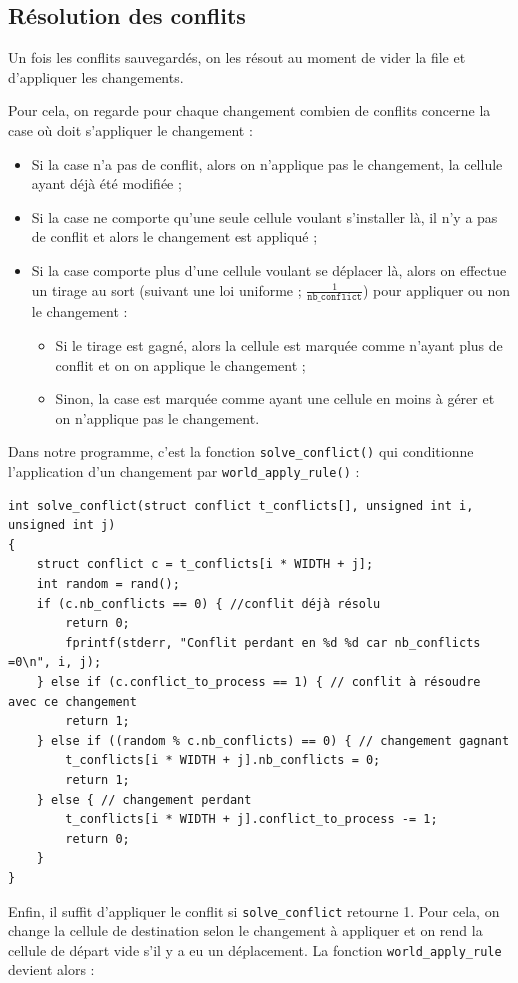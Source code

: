 \subsection{Résolution des conflits} \label{sec:Conflits}
Un fois les conflits sauvegardés, on les résout au moment de vider la file et d'appliquer les changements.

Pour cela, on regarde pour chaque changement combien de conflits concerne la case où doit s'appliquer le changement :
\begin{itemize}
    \item Si la case n'a pas de conflit, alors on n'applique pas le changement, la cellule ayant déjà été modifiée ;
    \item Si la case ne comporte qu'une seule cellule voulant s'installer là, il n'y a pas de conflit et alors le changement est appliqué ;
    \item Si la case comporte plus d'une cellule voulant se déplacer là, alors on effectue un tirage au sort (suivant une loi uniforme ; $\frac{1}{\texttt{nb\_conflict}}$) pour appliquer ou non le changement :
    \begin{itemize}
    \item Si le tirage est gagné, alors la cellule est marquée comme n'ayant plus de conflit et on on applique le changement ;
    \item Sinon, la case est marquée comme ayant une cellule en moins à gérer et on n'applique pas le changement.
    \end{itemize}
\end{itemize}
Dans notre programme, c'est la fonction \lstinline{solve_conflict()} qui conditionne l'application d'un changement par \lstinline{world_apply_rule()} :
\begin{lstlisting}
int solve_conflict(struct conflict t_conflicts[], unsigned int i, unsigned int j)
{
    struct conflict c = t_conflicts[i * WIDTH + j];
    int random = rand();
    if (c.nb_conflicts == 0) { //conflit déjà résolu
        return 0;
        fprintf(stderr, "Conflit perdant en %d %d car nb_conflicts =0\n", i, j);
    } else if (c.conflict_to_process == 1) { // conflit à résoudre avec ce changement
        return 1;
    } else if ((random % c.nb_conflicts) == 0) { // changement gagnant
        t_conflicts[i * WIDTH + j].nb_conflicts = 0;
        return 1;
    } else { // changement perdant
        t_conflicts[i * WIDTH + j].conflict_to_process -= 1;
        return 0;
    }
}
\end{lstlisting}
Enfin, il suffit d'appliquer le conflit si \lstinline{solve_conflict} retourne 1. Pour cela, on change la cellule de destination selon le changement à appliquer et on rend la cellule de départ vide s'il y a eu un déplacement. La fonction \lstinline{world_apply_rule} devient alors :

